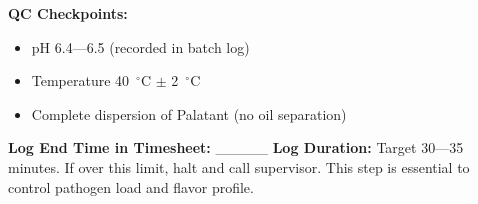 \textbf{QC Checkpoints:}
\begin{itemize}
\item 
pH 6.4---6.5 (recorded in batch log)
\item Temperature 40~$^\circ$C $\pm$ 2~$^\circ$C
\item Complete dispersion of Palatant (no oil separation)
\end{itemize}
\textbf{Log End Time in Timesheet:} \_\_\_\_\_
\textbf{Log Duration:} Target 30---35 minutes.
If over this limit, halt and call supervisor. This step is essential to control pathogen load and flavor profile.



